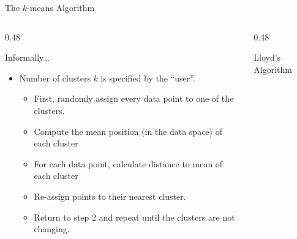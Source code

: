 \documentclass[aspectratio=169]{beamer}
\begin{document}
\begin{frame}{The $k$-means Algorithm}
  \begin{columns}[t]
    \begin{column}{0.48\textwidth}
      \begin{block}{Informally\dots}
        \begin{itemize}
          \item Number of clusters $k$ is specified by the ``user''. 
          \begin{itemize}
            \item[1)] First, randomly assign every data point to one of the clusters.
            \item[2)] Compute the mean position (in the data space) of each cluster
            \item[3)] For each data point, calculate distance to mean of each cluster
            \item[4)] Re-assign points to their nearest cluster.
            \item[5)] Return to step 2 and repeat until the clusters are not changing.
          \end{itemize}
        \end{itemize}
      \end{block}
    \end{column}
    \begin{column}{0.48\textwidth}
      \begin{block}{Lloyd's Algorithm}
\end{block}
\end{column}
\end{columns}
\end{frame}
\end{document}
